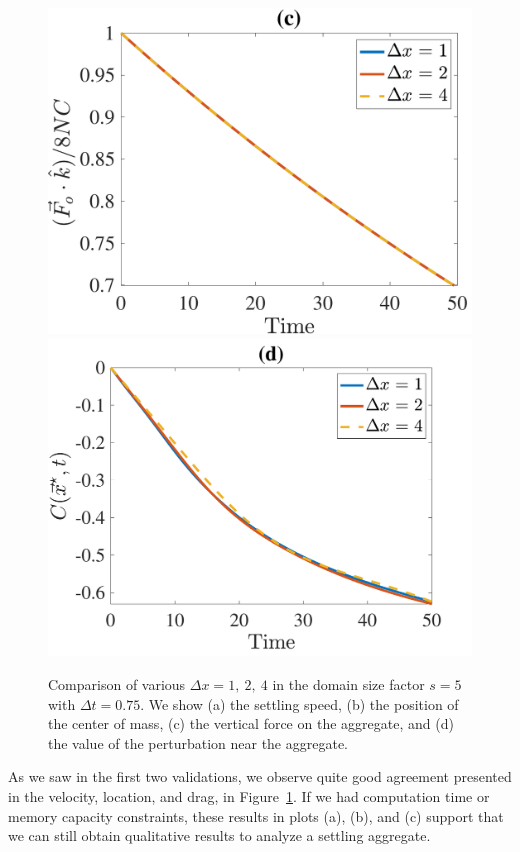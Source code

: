 \begin{figure}[ht]
\begin{center}
		\includegraphics[scale=0.35]{./figures/fig_NC10_dx_Fo3_all}
		\includegraphics[scale=0.35]{./figures/fig_NC10_dx_C_star_interp3}
	\caption{Comparison of various $\Delta x = 1, \ 2, \ 4$ in the domain size factor $s = 5$ with $\Delta t = 0.75$. We show (a) the settling speed, (b) the position of the center of mass, (c) the vertical force on the aggregate, and (d) the value of the perturbation near the aggregate.}
	\label{fig_NC10_compare_dx}
\end{center}
\end{figure}
As we saw in the first two validations, we observe quite good agreement presented in the velocity, location, and drag, in Figure~\ref{fig_NC10_compare_dx}. If we had computation time or memory capacity constraints, these results in plots (a), (b), and (c) support that we can still obtain qualitative results to analyze a settling aggregate. 
